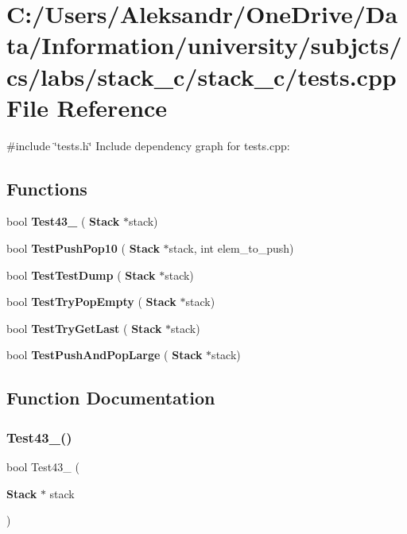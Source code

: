 \section{C\+:/\+Users/\+Aleksandr/\+One\+Drive/\+Data/\+Information/university/subjcts/cs/labs/stack\+\_\+c/stack\+\_\+c/tests.cpp File Reference}
\label{tests_8cpp}
{\ttfamily \#include \char`\"{}tests.\+h\char`\"{}}\newline
Include dependency graph for tests.\+cpp\+:
\subsection*{Functions}
\begin{DoxyCompactItemize}
\item 
bool \textbf{ Test43\+\_} (\textbf{ Stack} $\ast$stack)
\item 
bool \textbf{ Test\+Push\+Pop10} (\textbf{ Stack} $\ast$stack, int elem\+\_\+to\+\_\+push)
\item 
bool \textbf{ Test\+Test\+Dump} (\textbf{ Stack} $\ast$stack)
\item 
bool \textbf{ Test\+Try\+Pop\+Empty} (\textbf{ Stack} $\ast$stack)
\item 
bool \textbf{ Test\+Try\+Get\+Last} (\textbf{ Stack} $\ast$stack)
\item 
bool \textbf{ Test\+Push\+And\+Pop\+Large} (\textbf{ Stack} $\ast$stack)
\end{DoxyCompactItemize}


\subsection{Function Documentation}
\mbox{\label{tests_8cpp_a493ef3151f86304ba8b029ecd4f182a6}} 
\subsubsection{Test43\+\_()}
{\footnotesize\ttfamily bool Test43\+\_ (\begin{DoxyParamCaption}\item[{\textbf{ Stack} $\ast$}]{stack }\end{DoxyParamCaption})}

